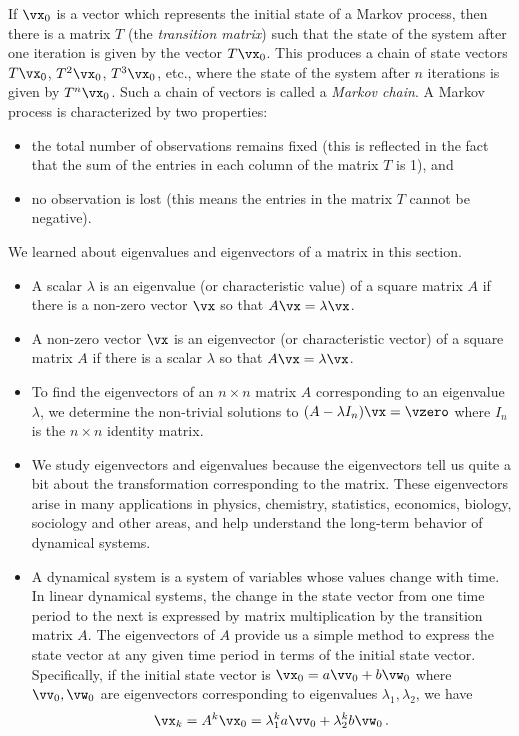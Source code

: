 \begin{example}
If $\vx_0$ is a vector which represents the initial state of a Markov process, then there is a matrix $T$ (the \emph{transition matrix}) such that the state of the system after one iteration is given by the vector $T\vx_0$. This produces a chain of state vectors $T\vx_0$, $T^2 \vx_0$, $T^3 \vx_0$, etc., where the state of the system after $n$ iterations is given by $T^n \vx_0$.  Such a chain of vectors is called a \emph{Markov chain}. A Markov process is characterized by two properties:
\begin{itemize}
\item the total number of observations remains fixed (this is reflected in the fact that the sum of the entries in each column of the matrix $T$ is 1), and
\item no observation is lost (this means the entries in the matrix $T$ cannot be negative).
\end{itemize}


\end{example}

\label{sec:eigen_summ}
We learned about eigenvalues and eigenvectors of a matrix in this section.
\begin{itemize}
\item A scalar $\lambda$ is an  eigenvalue (or characteristic value) of a square matrix $A$ if there is a non-zero vector $\vx$ so that $A\vx = \lambda \vx$.
\item A non-zero vector $\vx$ is an eigenvector (or characteristic vector) of a square matrix $A$ if there is a scalar $\lambda$ so that $A\vx = \lambda \vx$.
\item To find the eigenvectors of an $n \times n$ matrix $A$ corresponding to an eigenvalue $\lambda$, we determine the non-trivial solutions to $(A - \lambda I_n)\vx=\vzero$ where $I_n$ is the $n\times n$ identity matrix.
\item We study eigenvectors and eigenvalues because the eigenvectors tell us quite a bit about the transformation corresponding to the matrix. These eigenvectors arise in many applications in physics, chemistry, statistics, economics, biology, sociology and other areas, and help understand the long-term behavior of dynamical systems.
\item A dynamical system is a system of variables whose values change with time. In linear dynamical systems, the change in the state vector from one time period to the next is expressed by matrix multiplication by the transition matrix $A$. The eigenvectors of $A$ provide us a simple method to express the state vector at any given time period in terms of the initial state vector. Specifically, if the initial state vector is $\vx_0=a\vv_0+b\vw_0$ where $\vv_0, \vw_0$ are eigenvectors corresponding to eigenvalues $\lambda_1, \lambda_2$, we have 
\[ \vx_k = A^k \vx_0 = \lambda_1^k a \vv_0 + \lambda_2^k b \vw_0\,.\]
\end{itemize}




